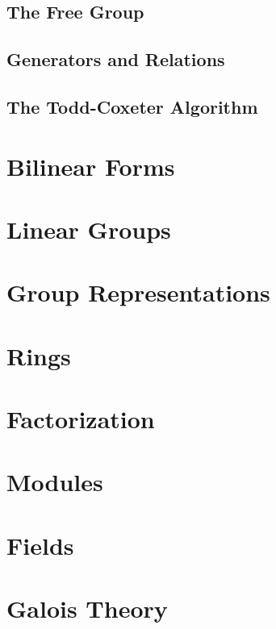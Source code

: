 \documentclass[12pt]{book}
\begin{document}
\section{The Free Group}
\section{Generators and Relations}
\section{The Todd-Coxeter Algorithm}



\chapter{Bilinear Forms}




\chapter{Linear Groups}




\chapter{Group Representations}




\chapter{Rings}




\chapter{Factorization}




\chapter{Modules}





\chapter{Fields}




\chapter{Galois Theory}
\end{document}
